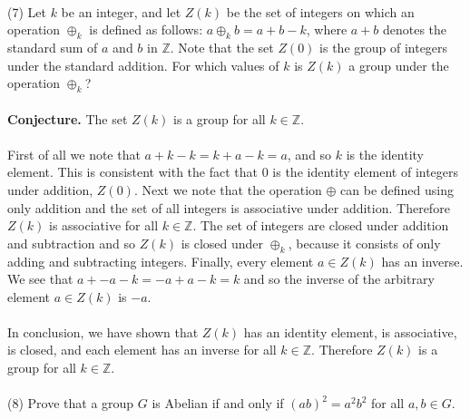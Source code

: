 \documentclass[11pt,a4paper]{article}
\begin{document}
~\\
(7) Let $k$ be an integer, and let $Z(k)$ be the set of integers on which an operation
$\oplus_k$ is defined as follows:
$a \oplus_k b = a + b − k$,
where $a + b$ denotes the standard sum of $a$ and $b$ in $\mathbb{Z}$. Note that the set $Z(0)$
is the group of integers under the standard addition. For which values of $k$ is
$Z(k)$ a group under the operation $\oplus_k$?\\
~\\
{\bf Conjecture. } The set $Z(k)$ is a group for all $k\in \mathbb{Z}$.\\
~\\
First of all we note that $a+k-k = k + a -k = a$, and so $k$ is the identity element. This is consistent with the fact that $0$ is the identity element of integers under addition, $Z(0)$. Next we note that the operation $\oplus$ can be defined using only addition and the set of all integers is associative under addition. Therefore $Z(k)$ is associative for all $k\in \mathbb{Z}$. The set of integers are closed under addition and subtraction and so $Z(k)$ is closed under $\oplus_k$, because it consists of only adding and subtracting integers. Finally, every element $a\in Z(k)$ has an inverse. We see that $a + -a -k = -a + a - k = k$ and so the inverse of the arbitrary element $a \in Z(k)$ is $-a$.\\
~\\
In conclusion, we have shown that $Z(k)$ has an identity element, is associative, is closed, and each element has an inverse for all $k\in \mathbb{Z}$. Therefore $Z(k)$ is a group for all $k\in \mathbb{Z}$.\\
~\\
(8) Prove that a group $G$ is Abelian if and only if $(ab)^2 = a^2 b^2$ for all $a, b \in G$.
\end{document}
